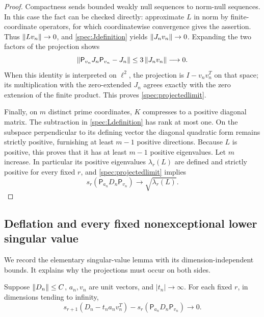 \begin{proof}
Compactness sends bounded weakly null sequences to norm-null sequences. In this case the fact can be checked directly: approximate $L$ in norm by finite-coordinate operators, for which coordinatewise convergence gives the assertion. Thus $\left\lVert Lv_n\right\rVert\to0$, and \eqref{spec:Jdefinition} yields $\left\lVert J_nv_n\right\rVert\to0$. Expanding the two factors of the projection shows
\[
 \left\lVert\mathsf P_{v_n}J_n\mathsf P_{v_n}-J_n\right\rVert
 \le3\left\lVert J_nv_n\right\rVert\longrightarrow0.
\]
When this identity is interpreted on $\ell^2$, the projection is $I-v_nv_n^T$ on that space; its multiplication with the zero-extended $J_n$ agrees exactly with the zero extension of the finite product. This proves \eqref{spec:projectedlimit}.

Finally, on $m$ distinct prime coordinates, $K$ compresses to a positive diagonal matrix. The subtraction in \eqref{spec:Ldefinition} has rank at most one. On the subspace perpendicular to its defining vector the diagonal quadratic form remains strictly positive, furnishing at least $m-1$ positive directions. Because $L$ is positive, this proves that it has at least $m-1$ positive eigenvalues. Let $m$ increase. In particular its positive eigenvalues $\lambda_r(L)$ are defined and strictly positive for every fixed $r$, and \eqref{spec:projectedlimit} implies
\begin{equation}\label{spec:projectedsingular}
 s_r(\mathsf P_{a_n}D_n\mathsf P_{v_n})
 \longrightarrow\sqrt{\lambda_r(L)}.
\end{equation}
\end{proof}

\subsection{Deflation and every fixed nonexceptional lower singular value}

We record the elementary singular-value lemma with its dimension-independent bounds. It explains why the projections must occur on both sides.

\begin{lemma}\label{spec:deflation}
Suppose $\left\lVert D_n\right\rVert\le C$, $a_n,v_n$ are unit vectors, and $|t_n|\to\infty$. For each fixed $r$, in dimensions tending to infinity,
\[
 s_{r+1}(D_n-t_na_nv_n^T)
 -s_r(\mathsf P_{a_n}D_n\mathsf P_{v_n})\longrightarrow0.
\]
\end{lemma}

